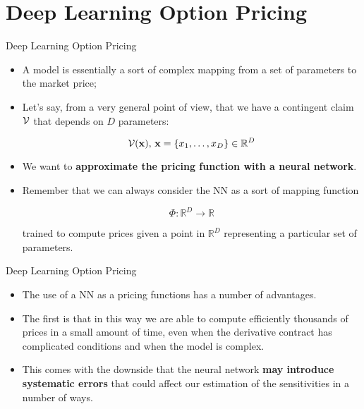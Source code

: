 \documentclass[11pt]{beamer}
\begin{document}
\section{Deep Learning Option Pricing}
\begin{frame}{Deep Learning Option Pricing}
	\begin{itemize}
		\item A model is essentially a sort of complex mapping from a set of parameters to the market price;
		\item Let's say, from a very general point of view, that we have a contingent claim $\cal{V}$ that depends on $D$ parameters:

$$
{\cal{V}}(\mathbf{x}), \, \mathbf{x}=\left\{x_1,\dots, x_D \right\} \in \mathbb{R}^D
$$

\item We want to \textbf{approximate the pricing function with a neural network}. 
\item Remember that we can always consider the NN as a sort of mapping function 

$$
\Phi : \mathbb{R}^D \rightarrow \mathbb{R}
$$

trained to compute prices given a point in $\mathbb{R}^D $ representing a particular set of parameters.  
	\end{itemize}
\end{frame}
\begin{frame}{Deep Learning Option Pricing}
	\begin{itemize}
		\item The use of a NN as a pricing functions has a number of advantages. 
		\item The first is that in this way we are able to compute efficiently thousands of prices in a small amount of time, even when the derivative contract has complicated conditions and when the model is complex. 
		\item This comes with the downside that the neural network \textbf{may introduce systematic errors} that could affect our estimation of the sensitivities in a number of ways. 

	\end{itemize}
\end{frame}
\end{document}
